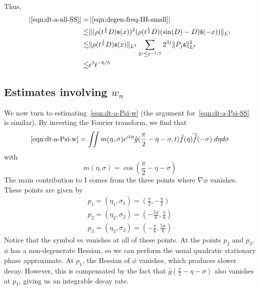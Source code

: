 \documentclass[letterpaper, reqno,final]{amsart}
\newcommand{\fs}{\mathfrak{s}}
\newcommand{\fhPi}{\frac{\pi}{2}}
\newcommand{\rmI}{\mathrm{I}}
\newcommand{\SSCutoff}[1][\xi]{\rho(t^\frac{1}{5} #1)}
\begin{document}
Thus,
\begin{equation}\begin{split}
    |\eqref{eqn:dt-a-all-SS}| =& \left|\eqref{eqn:degen-freq-III-small}\right|\\
    \lesssim& \lVert (\SSCutoff[D] \fs(x))^2 (\SSCutoff[D](\sin(D) - D) \overline{\fs}(-x)) \rVert_{L^1}\\
    \lesssim& \lVert \SSCutoff[D] \fs(x) \rVert_{L^2} \sum_{2^j \lesssim t^{-1/5}} 2^{3j} \lVert P_j \fs \rVert_{L^4}^2\\
    \lesssim& \epsilon^3 t^{-6/5}
\end{split}\end{equation}

\subsection{Estimates involving \texorpdfstring{$w_n$}{w\_n}}

We now turn to estimating~\eqref{eqn:dt-a-Psi-w} (the argument for~\eqref{eqn:dt-a-Psi-SS} is similar).  By inverting the Fourier transform, we find that
\begin{equation*}
    \eqref{eqn:dt-a-Psi-w} = \iint m(\eta, \sigma) e^{it\phi} \hat{g}(\fhPi-\eta-\sigma,t) \hat{f}(\eta) \overline{\hat{f}}(-\sigma) \;d\eta d\sigma
\end{equation*}
with
\begin{equation*}
    m(\eta,\sigma) = \cos\left(\fhPi - \eta - \sigma\right)
\end{equation*}
The main contribution to $\rmI$ comes from the three points where $\nabla \phi$ vanishes.  These points are given by
\begin{equation*}\begin{split}
    p_1 = (\eta_1,\sigma_1) = \left(\fhPi, -\fhPi\right)\\
    p_2 = (\eta_2,\sigma_2) = \left(-\frac{5\pi}{6}, \frac{\pi}{6}\right)\\
    p_3 = (\eta_3,\sigma_3) = \left(-\frac{\pi}{6}, \frac{5\pi}{6}\right)
\end{split}\end{equation*}
Notice that the symbol $m$ vanishes at all of these points.  At the points $p_2$ and $p_3$, $\phi$ has a non-degenerate Hessian, so we can perform the usual quadratic stationary phase approximate.  At $p_1$, the Hessian of $\phi$ vanishes, which produces slower decay. However, this is compensated by the fact that $\hat{g}\left(\fhPi - \eta - \sigma\right)$ also vanishes at $p_1$, giving us an integrable decay rate.
\end{document}
